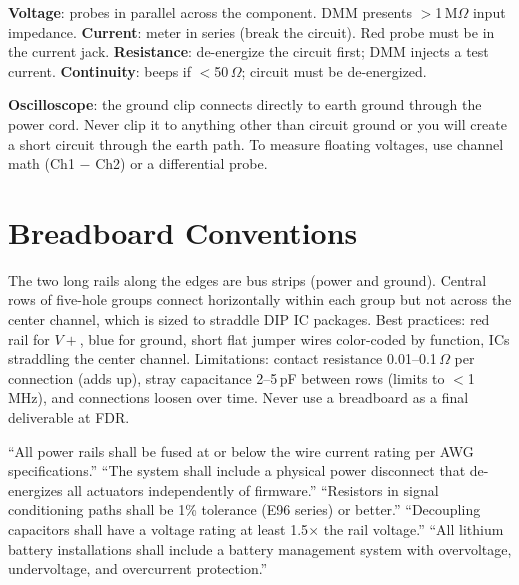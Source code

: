 \documentclass[11pt,letterpaper,twoside,openany]{book}
\begin{document}
\textbf{Voltage}: probes in parallel across the component. DMM presents $>$1\,M$\Omega$ input impedance. \textbf{Current}: meter in series (break the circuit). Red probe must be in the current jack. \textbf{Resistance}: de-energize the circuit first; DMM injects a test current. \textbf{Continuity}: beeps if $<$50\,$\Omega$; circuit must be de-energized.

\textbf{Oscilloscope}: the ground clip connects directly to earth ground through the power cord. Never clip it to anything other than circuit ground or you will create a short circuit through the earth path. To measure floating voltages, use channel math (Ch1 $-$ Ch2) or a differential probe.


\section{Breadboard Conventions}

The two long rails along the edges are bus strips (power and ground). Central rows of five-hole groups connect horizontally within each group but not across the center channel, which is sized to straddle DIP IC packages. Best practices: red rail for $V+$, blue for ground, short flat jumper wires color-coded by function, ICs straddling the center channel. Limitations: contact resistance 0.01--0.1\,$\Omega$ per connection (adds up), stray capacitance 2--5\,pF between rows (limits to $<$1\,MHz), and connections loosen over time. Never use a breadboard as a final deliverable at FDR.

\begin{keyconceptbox}
``All power rails shall be fused at or below the wire current rating per AWG specifications.'' ``The system shall include a physical power disconnect that de-energizes all actuators independently of firmware.'' ``Resistors in signal conditioning paths shall be 1\% tolerance (E96 series) or better.'' ``Decoupling capacitors shall have a voltage rating at least 1.5$\times$ the rail voltage.'' ``All lithium battery installations shall include a battery management system with overvoltage, undervoltage, and overcurrent protection.''
\end{keyconceptbox}
\end{document}
